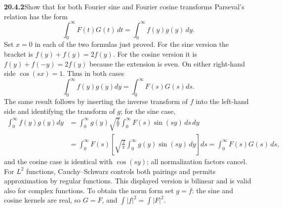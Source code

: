 \par\bigskip
\noindent\textbf{20.4.2}\quad Show that for both Fourier sine and
Fourier cosine transforms Parseval's relation has the form
\[
\int_{0}^{\infty}F(t)G(t)\,dt=\int_{0}^{\infty}f(y)g(y)\,dy.
\]
\solution
Set $x=0$ in each of the two formulas just proved.
For the sine version the bracket is $f(y)+f(y)=2f(y)$.
For the cosine version it is $f(y)+f(-y)=2f(y)$ because the
extension is even. On either right-hand side $\cos(sx)=1$.
Thus in both cases
\[
\boxed{\int_0^\infty f(y)g(y)dy
=\int_0^\infty F(s)G(s)ds}.
\]
The same result follows by inserting the inverse transform of
$f$ into the left-hand side and identifying the transform of
$g$; for the sine case,
\begin{align*}
\int_0^\infty f(y)g(y)dy
&=\int_0^\infty g(y)\sqrt{\frac2\pi}\int_0^\infty F(s)\sin(sy)\,ds\,dy\\
&=\int_0^\infty F(s)\left[\sqrt{\frac2\pi}\int_0^\infty
g(y)\sin(sy)\,dy\right]ds
=\int_0^\infty F(s)G(s)\,ds,
\end{align*}
and the cosine case is identical with $\cos(sy)$; all
normalization factors cancel. For $L^2$ functions,
Cauchy--Schwarz controls both pairings and permits approximation
by regular functions. This displayed version is bilinear and is
valid also for complex functions. To obtain the norm form set
$g=\overline f$: the sine and cosine kernels are real, so
$G=\overline F$, and
$\int|f|^2=\int|F|^2$.

